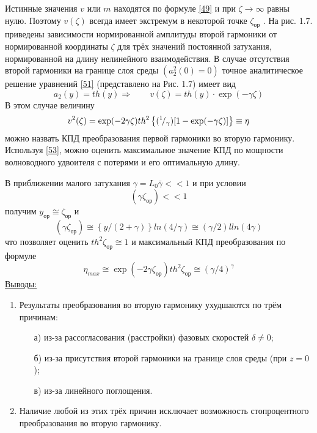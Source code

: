 \documentclass[a4paper]{article}
\begin{document}
	Истинные значения $v$ или $m$  находятся по формуле \eqref{49} и при $\zeta\rightarrow\infty$ равны нулю. Поэтому $v(\zeta)$ всегда имеет экстремум в некоторой точке $\zeta_{\text{ор}}$ . На рис. 1.7. приведены зависимости нормированной амплитуды второй гармоники от нормированной координаты $\zeta$ для трёх значений постоянной затухания, нормированной на длину нелинейного взаимодействия. В случае отсутствия второй гармоники на границе слоя среды $(a_{2}^{2}(0)=0)$ точное аналитическое решение уравнений \eqref{51} (представлено на Рис. 1.7)  имеет вид  
	\vspace{3cm}
	$$a_{2}(y)=th(y)\Rightarrow\qquad v(\zeta)=th(y)\cdot \exp(-\gamma\zeta)$$
	В этом случае величину
	\begin{equation}
		v^{2}(\zeta)=\exp(-2\gamma\zeta)th^{2}\left\{({}^{1}\!/_{\gamma}) [1-\exp(-\gamma\zeta)] \right\}\equiv\eta\label{53}
	\end{equation}
	можно назвать КПД преобразования первой гармоники во вторую гармонику. Используя \eqref{53}, можно оценить максимальное значение КПД по мощности волноводного удвоителя с потерями и его оптимальную длину. 
	
	В приближении малого затухания $\gamma=L_{0}\bar{\gamma}<<1$ и при условии 
	\begin{equation}
		(\gamma\zeta_{\text{ор}})<<1\label{54}
	\end{equation}
	получим $y_{\text{ор}}\cong\zeta_{\text{ор}}$ и 
	\begin{equation}
		(\gamma\zeta_{\text{ор}})\cong\left\{y/(2+\gamma)\right\}ln(4/\gamma)\cong(\gamma/2)lln(4\gamma)\label{55}
	\end{equation}
	что позволяет оценить $th^{2}\zeta_{\text{ор}}\cong1$ и максимальный КПД преобразования по формуле 
	\begin{equation}
		\eta_{max}\cong\exp(-2\gamma\zeta_{\text{ор}})th^{2}\zeta_{\text{ор}}\cong(\gamma/4)^{\gamma}\label{56}
	\end{equation}
	\underline{Выводы:}
	\begin{enumerate}
		\item Результаты преобразования во вторую гармонику ухудшаются по трём причинам: 
		\begin{enumerate}
			\item[а)] из-за рассогласования (расстройки) фазовых скоростей $\delta\neq0$; 
			\item[б)] из-за присутствия второй гармоники на границе слоя среды (при  $z = 0$); 
			\item[в)] из-за линейного поглощения.
		\end{enumerate}
		\item Наличие любой из этих трёх причин исключает возможность стопроцентного преобразования во вторую гармонику.
	\end{enumerate}
	
\end{document}
